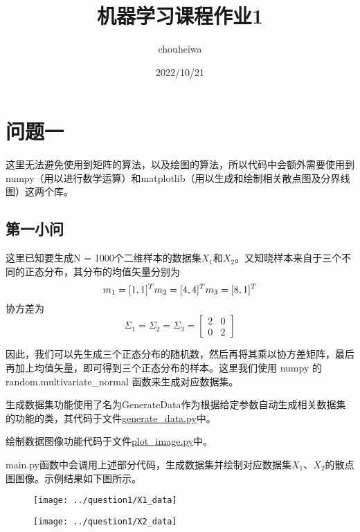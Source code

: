 \documentclass[UTF8]{article} %
\title{机器学习课程作业1}
\author{chouheiwa}
\date{2022/10/21}
\begin{document}
    \maketitle


    \section{问题一}
    这里无法避免使用到矩阵的算法，以及绘图的算法，所以代码中会额外需要使用到numpy（用以进行数学运算）和matplotlib（用以生成和绘制相关散点图及分界线图）这两个库。

    \subsection{第一小问}
    这里已知要生成N = 1000个二维样本的数据集$X_1$和$X_2$。又知晓样本来自于三个不同的正态分布，其分布的均值矢量分别为
    \[
        m_1 = [1, 1]^T\\m_2 = [4, 4]^T\\m_3 = [8, 1]^T
    \]
    协方差为
    \[
        \Sigma_1 = \Sigma_2 = \Sigma_3 = \begin{bmatrix}
                                             2 & 0 \\ 0 & 2
        \end{bmatrix}
    \]

    因此，我们可以先生成三个正态分布的随机数，然后再将其乘以协方差矩阵，最后再加上均值矢量，即可得到三个正态分布的样本。这里我们使用 numpy 的 random.multivariate\_normal 函数来生成对应数据集。

    生成数据集功能使用了名为GenerateData作为根据给定参数自动生成相关数据集的功能的类，其代码于文件\href{run:generate_data.py}{generate\_data.py}中。

    绘制数据图像功能代码于文件\href{run:plot_image.py}{plot\_image.py}中。

    main.py函数中会调用上述部分代码，生成数据集并绘制对应数据集$X_1$、$X_2$的散点图图像。示例结果如下图所示。

    \begin{figure}[htbp]
        \begin{minipage}[t]{0.45\linewidth}
            \centering
            \texttt{[image: ../question1/X1\_data]}
        \end{minipage}%
        \begin{minipage}[t]{0.45\linewidth}
            \centering
            \texttt{[image: ../question1/X2\_data]}
        \end{minipage}\label{fig:figure}
    \end{figure}
\end{document}
